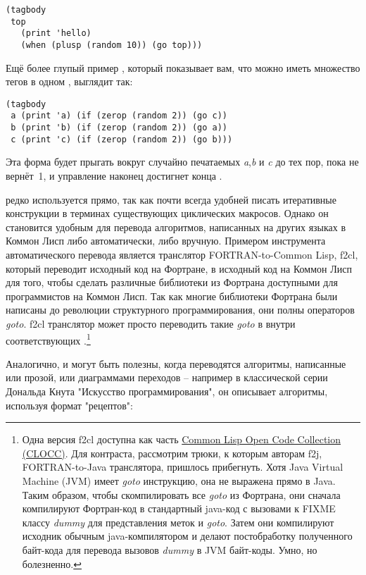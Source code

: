 \begin{lstlisting}
(tagbody
 top
   (print 'hello)
   (when (plusp (random 10)) (go top)))
\end{lstlisting}

Ещё более глупый пример , который показывает вам, что можно иметь множество
тегов в одном , выглядит так:

\begin{lstlisting}
(tagbody
 a (print 'a) (if (zerop (random 2)) (go c))
 b (print 'b) (if (zerop (random 2)) (go a))
 c (print 'c) (if (zerop (random 2)) (go b)))
\end{lstlisting}

Эта форма будет прыгать вокруг случайно печатаемых \textit{a},\textit{b} и \textit{c} до
тех пор, пока  не вернёт~1, и управление наконец достигнет конца
.

 редко используется прямо, так как почти всегда удобней писать итеративные
конструкции в терминах существующих циклических макросов. Однако он становится удобным для
перевода алгоритмов, написанных на других языках в Коммон Лисп либо автоматически, либо
вручную. Примером инструмента автоматического перевода является транслятор
FORTRAN-to-Common Lisp, f2cl, который переводит исходный код на Фортране, в исходный код
на Коммон Лисп для того, чтобы сделать различные библиотеки из Фортрана доступными для
программистов на Коммон Лисп. Так как многие библиотеки Фортрана были написаны до
революции структурного программирования, они полны операторов \textit{goto}. f2cl
транслятор может просто переводить такие \textit{goto} в  внутри соответствующих
.\footnote{Одна версия f2cl доступна как часть
  \href{http://clocc.sourceforge.net/}{Common Lisp Open Code Collection (CLOCC)}. Для
  контраста, рассмотрим трюки, к которым авторам f2j, FORTRAN-to-Java транслятора,
  пришлось прибегнуть. Хотя Java Virtual Machine (JVM) имеет \textit{goto} инструкцию, она
  не выражена прямо в Java. Таким образом, чтобы скомпилировать все \textit{goto} из
  Фортрана, они сначала компилируют Фортран-код в стандартный java-код с вызовами к FIXME
  классу \textit{dummy} для представления меток и \textit{goto}. Затем они компилируют
  исходник обычным java-компилятором и делают постобработку полученного байт-кода для
  перевода вызовов \textit{dummy} в JVM байт-коды. Умно, но болезненно.}

Аналогично,  и  могут быть полезны, когда переводятся алгоритмы, написанные или прозой, или диаграммами переходов -- например в классической серии Дональда Кнута "Искусство программирования", он описывает алгоритмы, используя формат "рецептов": 

